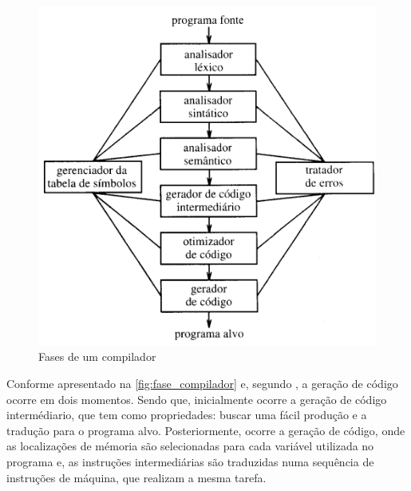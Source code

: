 \begin{figure}[H]
	\begin{center}
    \caption{\label{fig:fase_compilador}Fases de um compilador}
	\includegraphics[scale=0.70]{Figuras/fase_compilador.png}
	\end{center}
\end{figure}

\par
Conforme apresentado na \autoref{fig:fase_compilador} e, segundo , a geração de código ocorre em dois momentos. Sendo que, inicialmente ocorre a geração de código intermédiario, que tem como propriedades: buscar uma fácil produção e a tradução para o programa alvo. Posteriormente, ocorre a geração de código, onde as localizações de mémoria são selecionadas para cada variável utilizada no programa e, as instruções intermediárias são traduzidas numa sequência de instruções de máquina, que realizam a mesma tarefa.